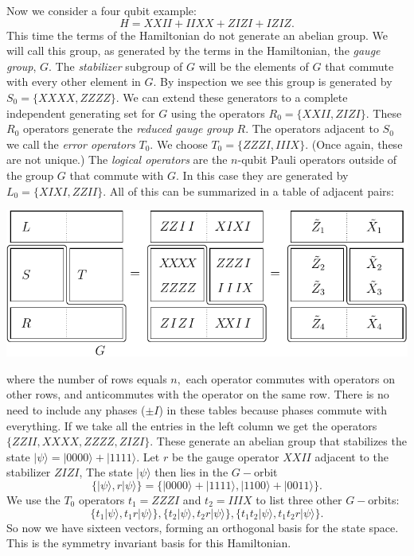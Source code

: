 \documentclass[11pt,oneside]{article}
\def\Ham{H}
\def\Stab{S}
\newcommand{\ket}[1]{|{#1}\rangle}
\newcommand\doexample[1]{\vskip 5pt \noindent {\bf \underline{Example #1.}\ }}
\newcounter{ritem}
\newcommand{\ritem}[1]{\refstepcounter{ritem}\theritem\label{#1}}
\begin{document}
\doexample{\ritem{Ex3}.}
Now we consider a four qubit example:
$$
    \Ham = XXII + IIXX + ZIZI + IZIZ.
$$
This time the terms of the Hamiltonian do not generate 
an abelian group.
We will call this group, as generated by the terms in the Hamiltonian,
the \emph{gauge group}, $G$.
The \emph{stabilizer} subgroup of $G$ will be the elements of $G$
that commute with every other element in $G.$
By inspection we see this group is generated by $\Stab_0=\{XXXX, ZZZZ\}.$
We can extend these generators to a complete independent generating
set for $G$ using the operators  $R_0=\{XXII, ZIZI\}.$
These $R_0$ operators generate the \emph{reduced gauge group} $R.$
The operators adjacent to $\Stab_0$ we
call the \emph{error operators} $T_0$. 
We choose $T_0 = \{ZZZI, IIIX\}.$
(Once again, these are not unique.)
The \emph{logical operators} are the $n$-qubit 
Pauli operators outside of the group
$G$ that commute with $G.$
In this case they are generated by $L_0 = \{XIXI, ZZII\}.$
All of this can be summarized in a table of adjacent pairs:
\begin{center}
\includegraphics[]{pic-gauge4.pdf}
\end{center}
where the number of rows equals $n,$ 
each operator commutes with operators on other rows,
and anticommutes with the operator on the same row. 
There is no need to include any phases ($\pm I$) in these tables
because phases commute with everything.
If we take all the entries in the left column
we get the operators 
$\{ ZZII, XXXX, ZZZZ, ZIZI \}.$ 
These generate an abelian group 
that stabilizes the
state $\ket{\psi} = \ket{0000}+\ket{1111}.$
Let $r$ be the gauge operator $XXII$ adjacent to the 
stabilizer $ZIZI$,
The state $\ket{\psi}$ then lies in the $G-$orbit 
$$
\{\ket{\psi}, r\ket{\psi}\} = \{\ket{0000}+\ket{1111}, \ket{1100}+\ket{0011}\}.
$$
We use the $T_0$ operators $t_1=ZZZI$ and $t_2=IIIX$
to list three other $G-$orbits:
$$
\{t_1 \ket{\psi}, t_1 r\ket{\psi}\}, 
\{t_2 \ket{\psi}, t_2 r\ket{\psi}\}, 
\{t_1 t_2 \ket{\psi}, t_1 t_2 r\ket{\psi}\}.
$$
So now we have sixteen vectors, forming an orthogonal basis for the state space.
This is the symmetry invariant basis for this Hamiltonian.
\end{document}
